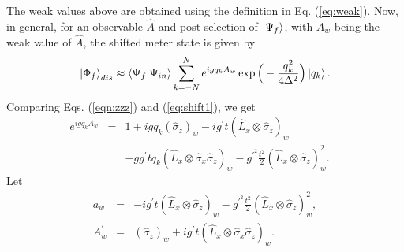 \documentclass[aps,pra,showpacs,twoside,twocolumn,10pt]{revtex4-1}
\begin{document}
The weak values above are obtained using the definition in Eq. (\ref{eq:weak}). Now, in general, for an observable $\hat{A}$  and post-selection of $\ket{\Psi_f}$, with $A_w$ being the weak value of $\hat{A}$, the shifted meter state is given by
\begin{equation}
\label{eq:shift1}
 \ket{\Phi_f}_{dis} \approx \braket{\Psi_f|\Psi_{in}}\sum_{k=-N}^N e^{igq_kA_w}\exp\Big(-\frac{q_k^2}{4\Delta^2}\Big)\ket{q_k}.
\end{equation}
Comparing Eqs. (\ref{eqn:zzz}) and (\ref{eq:shift1}), we get
\begin{eqnarray}
e^{igq_kA_w}&=&1+igq_k(\hat{\sigma}_z)_w-ig^{\prime}t(\hat{L}_x\otimes\hat{\sigma}_z)_w \nonumber\\ 
&&-gg^\prime tq_k(\hat{L}_x\otimes\hat{\sigma}_x\hat{\sigma}_z)_w-g^{\prime^2}\frac{t^2}{2}(\hat{L}_x\otimes\hat{\sigma}_z)_w^2. \quad
\label{shift2}
\end{eqnarray}
 Let
\begin{eqnarray}
a_w&=&-ig^{\prime}t(\hat{L}_x\otimes\hat{\sigma}_z)_w-g^{\prime^2}\frac{t^2}{2}(\hat{L}_x\otimes\hat{\sigma}_z)_w^2\nonumber,\\
A^{\prime}_w&=&(\hat{\sigma}_z)_w+ig^\prime t (\hat{L}_x\otimes\hat{\sigma}_x\hat{\sigma}_z)_w.
\label{eq:weak_noise}
 \end{eqnarray}
\end{document}
